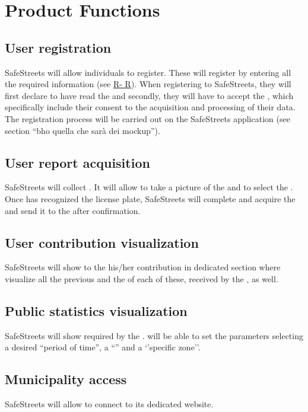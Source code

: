 \documentclass[../../rasd.tex]{subfiles}
\begin{document}
	
	\section{Product Functions}
	
	\subsection{User registration}
	SafeStreets will allow individuals to register. These will register by entering all the required information (see \hyperref[sect:3.2.5]{R- R}). When registering to SafeStreets, they will first declare to have read the  and secondly, they will have to accept the , which specifically include their consent to the acquisition and processing of their data. \\
	The  registration process will be carried out on the SafeStreets application (see section “bho quella che sarà dei mockup”). 
	
	\subsection{User report acquisition}
	SafeStreets will collect . It will allow  to take a picture of the  and to select the . Once  has recognized the license plate, SafeStreets will complete and acquire the  and send it to the  after  confirmation. 
	
	\subsection{User contribution visualization}
	SafeStreets will show to the  his/her contribution in dedicated section where visualize all the previous  and the  of each of these, received by the , as well.
	
	\subsection{Public statistics visualization}
	SafeStreets will show  required by the .  will be able to set the parameters selecting a desired “period of time”, a “” and a ‘’specific zone’’. 
	
	\subsection{Municipality access}
	SafeStreets will allow  to connect to its dedicated website.  
	
\end{document}
